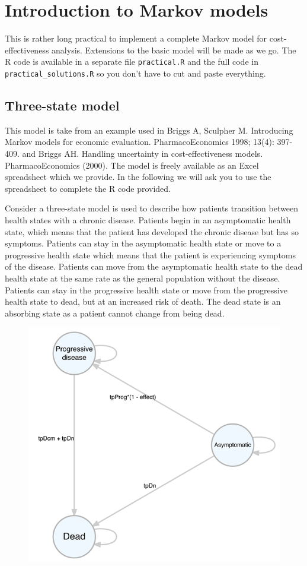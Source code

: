 \chapter{Introduction to Markov models}
This is rather long practical to implement a complete Markov model for cost-effectiveness analysis.
Extensions to the basic model will be made as we go.
The R code is available in a separate file \texttt{practical.R} and the full code in \texttt{practical\_solutions.R} so you don't have to cut and paste everything.

\section{Three-state model}
This model is take from an example used in Briggs A, Sculpher M. Introducing Markov models for economic evaluation. PharmacoEconomics 1998; 13(4): 397-409. and 
Briggs AH. Handling uncertainty in cost-effectiveness models. PharmacoEconomics (2000).
The model is freely available as an Excel spreadsheet which we provide. In the following we will ask you to use the spreadsheet to complete the R code provided.

Consider a three-state model is used to describe how patients transition between health states with a chronic disease.
Patients begin in an asymptomatic health state, which means that the patient has developed the chronic disease but has so symptoms.
Patients can stay in the asymptomatic health state or move to a progressive health state which means that the patient is experiencing symptoms of the disease.
Patients can move from the asymptomatic health state to the dead health state at the same rate as the general population without the disease.
Patients can stay in the progressive health state or move from the progressive health state to dead, but at an increased risk of death.
The dead state is an absorbing state as a patient cannot change from being dead.

\begin{figure}
\centering
\includegraphics[scale=1]{markov-models/model-diagram}
\end{figure}

